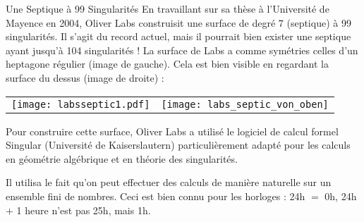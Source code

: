 \begin{surferPage}{Une Septique à 99 Singularités}
    En travaillant sur sa thèse à l'Université de Mayence en 2004, Oliver Labs 
    construisit une surface de degré $7$ (septique) à 99 singularités. Il s'agit du record actuel,
    mais il pourrait bien exister une septique ayant jusqu'à 104 singularités !
    La surface de Labs a comme symétries celles d'un heptagone régulier (image de gauche).
    Cela est bien visible en regardant la surface du dessus (image de droite) :

    \vspace*{-0.3em}
    \begin{center}
      \begin{tabular}{c@{\qquad}c}
        \texttt{[image: labsseptic1.pdf]}
        &
        \texttt{[image: labs\_septic\_von\_oben]}
      \end{tabular}
    \end{center}
    \vspace*{-0.3em}

    Pour construire cette surface, Oliver Labs a utilisé le logiciel de calcul formel
    {\sc Singular} (Université de Kaiserslautern) particulièrement adapté pour les calculs
    en géométrie algébrique et en théorie des singularités.

    Il utilisa le fait qu'on peut effectuer des calculs de manière naturelle sur un ensemble 
    fini de nombres. Ceci est bien connu pour les horloges :
    24h $=$ 0h, 24h $+$ 1 heure n'est pas 25h, mais 1h.
\end{surferPage}

